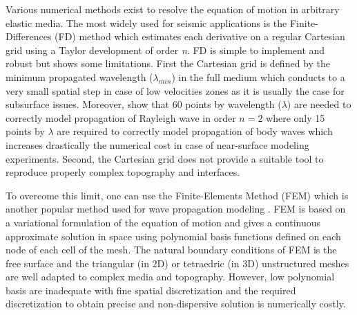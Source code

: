 \documentclass[manuscript,revised]{geophysics}
\begin{document}


\noindent Various numerical methods exist to resolve the equation of motion in arbitrary elastic media. The most widely used for seismic applications is the Finite-Differences (FD) method \citep{Virieux_PSV_1986,Levander_PSV_1988,Robertsson_FDM_1994,Pratt_EWM_1990,Stekl_VEM_1998,Saenger_FDM_2004} which estimates each derivative on a regular Cartesian grid using a Taylor development \citep{Moczo_FDM_2004} of order \textit{n}. FD is simple to implement and robust but shows some limitations. First the Cartesian grid is defined by the minimum propagated wavelength ($\lambda_{min}$) in the full medium which conducts to a very small spatial step in case of low velocities zones as it is usually the case for subsurface issues. Moreover, \citet{Saenger_FDM_2000} show that 60 points by wavelength ($\lambda$) are needed to correctly model propagation of Rayleigh wave in order $n=2$ where only 15 points by $\lambda$ are required to correctly model propagation of body waves which increases drastically the numerical cost in case of near-surface modeling experiments. Second, the Cartesian grid does not provide a suitable tool to reproduce properly complex topography and interfaces. 

\noindent To overcome this limit, one can use the Finite-Elements Method (FEM) which is another popular method used for wave propagation modeling \citep{Lysmer_FEM_1972,Seron_FEM_1990,Hulbert_FEM_1990}. FEM is based on a variational formulation of the equation of motion and gives a continuous approximate solution in space using polynomial basis functions defined on each node of each cell of the mesh. The natural boundary conditions of FEM is the free surface and the triangular (in 2D) or tetraedric (in 3D) unstructured meshes are well adapted to complex media and topography. However, low polynomial basis are inadequate with fine spatial discretization and the required discretization to obtain precise and non-dispersive solution is numerically costly. 
\end{document}
